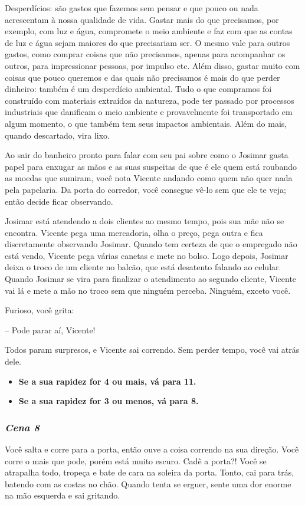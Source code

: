 Desperdícios: são gastos que fazemos sem pensar e que pouco ou nada acrescentam à nossa qualidade de vida. Gastar mais do que precisamos, por exemplo, com luz e água, compromete o meio ambiente e faz com que as contas de luz e água sejam maiores do que precisariam ser. O mesmo vale para outros gastos, como comprar coisas que não precisamos, apenas para acompanhar os outros, para impressionar pessoas, por impulso etc. Além disso, gastar muito com coisas que pouco queremos e das quais não precisamos é mais do que perder dinheiro: também é um desperdício ambiental. Tudo o que compramos foi construído com materiais extraídos da natureza, pode ter passado por processos industriais que danificam o meio ambiente e provavelmente foi transportado em algum momento, o que também tem seus impactos ambientais. Além do mais, quando descartado, vira lixo.

Ao sair do banheiro pronto para falar com seu pai sobre como o Josimar gasta papel
para enxugar as mãos e as suas suspeitas de que é ele quem está roubando as moedas
que sumiram, você nota Vicente andando como quem não quer nada pela papelaria.
Da porta do corredor, você consegue vê-lo sem que ele te veja; então decide ficar observando.

Josimar está atendendo a dois clientes ao mesmo tempo, pois sua mãe não se encontra. Vicente pega uma mercadoria, olha o preço, pega outra e fica discretamente observando Josimar. Quando tem certeza de que o empregado não está vendo, Vicente pega várias canetas e mete no bolso. Logo depois, Josimar deixa o troco de um cliente no balcão, que está desatento falando ao celular. Quando Josimar se vira para finalizar o atendimento ao segundo cliente, Vicente vai lá e mete a mão no troco sem que ninguém perceba. Ninguém, exceto você.

Furioso, você grita:

-- Pode parar aí, Vicente!

Todos param surpresos, e Vicente sai correndo. Sem perder tempo, você vai atrás dele.

\begin{itemize}
	\item \textbf{Se a sua rapidez for 4 ou mais, vá para 11.}
	\item \textbf{Se a sua rapidez for 3 ou menos, vá para 8.}
\end{itemize}

\bigskip\medskip

\subsubsection{\textit{\textbf{Cena 8}}}
Você salta e corre para a porta, então ouve a coisa correndo na sua direção. Você corre o mais que pode, porém está muito escuro. Cadê a porta?! Você se atrapalha todo, tropeça e bate de cara na soleira da porta. Tonto, cai para trás, batendo com as costas no chão.
Quando tenta se erguer, sente uma dor enorme na mão esquerda e sai gritando.

